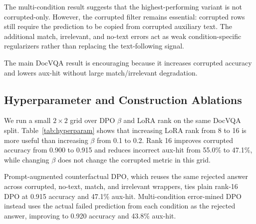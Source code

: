 The multi-condition result suggests that the highest-performing variant is not corrupted-only.
However, the corrupted filter remains essential: corrupted rows still require the prediction to be copied from corrupted auxiliary text.
The additional match, irrelevant, and no-text errors act as weak condition-specific regularizers rather than replacing the text-following signal.

The main DocVQA result is encouraging because it increases corrupted accuracy and lowers aux-hit without large match/irrelevant degradation.

\subsection{Hyperparameter and Construction Ablations}

We run a small $2 \times 2$ grid over DPO $\beta$ and LoRA rank on the same DocVQA split.
Table~\ref{tab:hyperparam} shows that increasing LoRA rank from 8 to 16 is more useful than increasing $\beta$ from 0.1 to 0.2.
Rank 16 improves corrupted accuracy from 0.900 to 0.915 and reduces incorrect aux-hit from 55.0\% to 47.1\%, while changing $\beta$ does not change the corrupted metric in this grid.

\begin{table}[t]
\centering
\caption{DocVQA DPO hyperparameter grid. Higher LoRA capacity matters more than $\beta$ in this setting.}
\label{tab:hyperparam}
\end{table}

Prompt-augmented counterfactual DPO, which reuses the same rejected answer across corrupted, no-text, match, and irrelevant wrappers, ties plain rank-16 DPO at 0.915 accuracy and 47.1\% aux-hit.
Multi-condition error-mined DPO instead uses the actual failed prediction from each condition as the rejected answer, improving to 0.920 accuracy and 43.8\% aux-hit.

